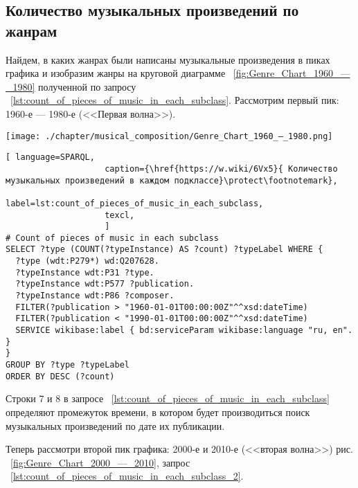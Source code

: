 \subsection{Количество музыкальных произведений по жанрам}
Найдем, в каких жанрах были написаны музыкальные произведения в пиках графика и изобразим жанры на круговой диаграмме ~\ref{fig:Genre_Chart_1960_—_1980} полученной по запросу ~\ref{lst:count_of_pieces_of_music_in_each_subclass}. Рассмотрим первый пик: 1960-е — 1980-е (<<Первая волна>>).
\begin{marginfigure}[0\baselineskip]
	\texttt{[image: ./chapter/musical\_composition/Genre\_Chart\_1960\_—\_1980.png]}
	\caption[Круговая диаграмма музыкальных жанров за 1960-1980 годы во всем мире]{Круговая диаграмма музыкальных жанров за 1960-1980 годы во всем мире. Ссылка на SPARQL-запрос: \href{https://w.wiki/6Vx5}{https://w.wiki/6Vx5}.}%
	\label{fig:Genre_Chart_1960_—_1980}%
\end{marginfigure}
\begin{lstlisting}[ language=SPARQL,
                    caption={\href{https://w.wiki/6Vx5}{ Количество музыкальных произведений в каждом подклассе}\protect\footnotemark},
                    label=lst:count_of_pieces_of_music_in_each_subclass,
                    texcl,
                    ]
# Count of pieces of music in each subclass
SELECT ?type (COUNT(?typeInstance) AS ?count) ?typeLabel WHERE {
  ?type (wdt:P279*) wd:Q207628.
  ?typeInstance wdt:P31 ?type.
  ?typeInstance wdt:P577 ?publication.
  ?typeInstance wdt:P86 ?composer.
  FILTER(?publication > "1960-01-01T00:00:00Z"^^xsd:dateTime)        
  FILTER(?publication < "1990-01-01T00:00:00Z"^^xsd:dateTime)
  SERVICE wikibase:label { bd:serviceParam wikibase:language "ru, en". }
}
GROUP BY ?type ?typeLabel
ORDER BY DESC (?count)
\end{lstlisting}%

Строки 7 и 8 в запросе ~\ref{lst:count_of_pieces_of_music_in_each_subclass} определяют промежуток времени, в котором будет производиться поиск музыкальных произведений по дате их публикации.


Теперь рассмотри второй пик графика: 2000-е и 2010-е (<<вторая волна>>) рис. ~\ref{fig:Genre_Chart_2000_—_2010}, запрос ~\ref{lst:count_of_pieces_of_music_in_each_subclass_2}.

